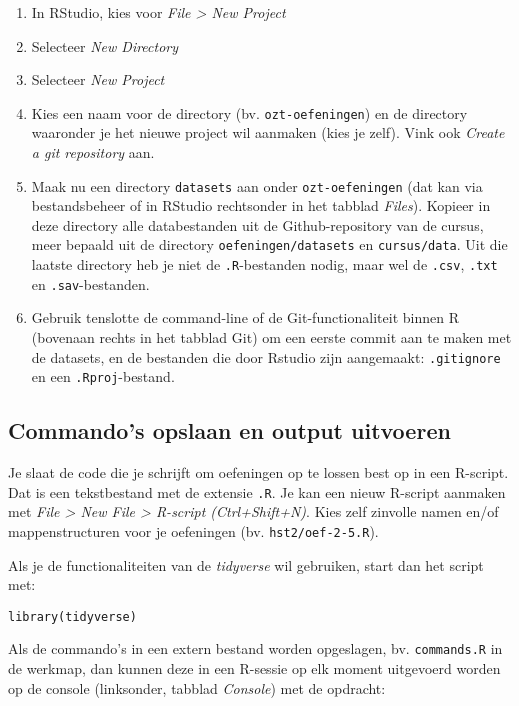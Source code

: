 \begin{enumerate}
  \item In RStudio, kies voor \textit{File > New Project}
  \item Selecteer \textit{New Directory}
  \item Selecteer \textit{New Project}
  \item Kies een naam voor de directory (bv. \texttt{ozt-oefeningen}) en de directory waaronder je het nieuwe project wil aanmaken (kies je zelf). Vink ook \textit{Create a git repository} aan.
  \item Maak nu een directory \texttt{datasets} aan onder \texttt{ozt-oefeningen} (dat kan via bestandsbeheer of in RStudio rechtsonder in het tabblad \textit{Files}). Kopieer in deze directory alle databestanden uit de Github-repository van de cursus, meer bepaald uit de directory \texttt{oefeningen/datasets} en \texttt{cursus/data}. Uit die laatste directory heb je niet de \texttt{.R}-bestanden nodig, maar wel de \texttt{.csv}, \texttt{.txt} en \texttt{.sav}-bestanden.
  \item Gebruik tenslotte de command-line of de Git-functionaliteit binnen R (bovenaan rechts in het tabblad Git) om een eerste commit aan te maken met de datasets, en de bestanden die door Rstudio zijn aangemaakt: \texttt{.gitignore} en een \texttt{.Rproj}-bestand.
\end{enumerate}

\subsection{Commando's opslaan en output uitvoeren}

Je slaat de code die je schrijft om oefeningen op te lossen best op in een R-script. Dat is een tekstbestand met de extensie \texttt{.R}. Je kan een nieuw R-script aanmaken met \textit{File > New File > R-script (Ctrl+Shift+N)}. Kies zelf zinvolle namen en/of mappenstructuren voor je oefeningen (bv. \texttt{hst2/oef-2-5.R}).

Als je de functionaliteiten van de \textit{tidyverse} wil gebruiken, start dan het script met:

\begin{lstlisting}
library(tidyverse)
\end{lstlisting}

Als de commando's in een extern bestand worden opgeslagen, bv. \texttt{commands.R} in de werkmap, dan kunnen deze in een R-sessie op elk moment uitgevoerd worden op de console (linksonder, tabblad \textit{Console}) met de opdracht:

